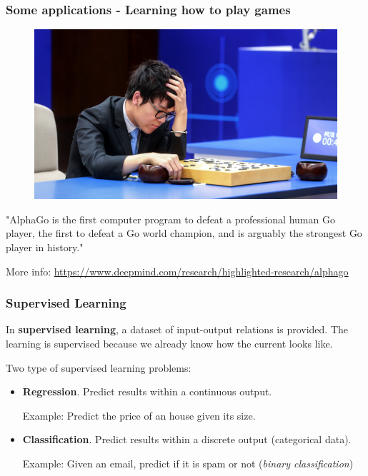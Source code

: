 \documentclass{beamer}
\begin{document}
	\begin{frame}
		\frametitle{Some applications - Learning how to play games}
		\begin{figure}
			\centering
			\includegraphics[scale=0.3]{images/alphago}
		\end{figure}
	
	"AlphaGo is the first computer program to defeat a professional human Go player, the first to defeat a Go world champion, and is arguably the strongest Go player in history." 
	
	More info: \href{https://www.deepmind.com/research/highlighted-research/alphago}{https://www.deepmind.com/research/highlighted-research/alphago}
		
		
	\end{frame}

	\begin{frame}
		\frametitle{Supervised Learning}
		In \textbf{supervised learning}, a dataset of input-output relations is provided.
		The learning is supervised because we already know how the current looks like.
		
		Two type of supervised learning problems:
		\begin{itemize}
			\item \textbf{Regression}. Predict results within a continuous output.
			
			Example: Predict the price of an house given its size.
			\item \textbf{Classification}.  Predict results within a discrete output (categorical data).
			
			Example: Given an email, predict if it is spam or not (\textsl{binary classification})
		\end{itemize}
	\end{frame}
\end{document}
